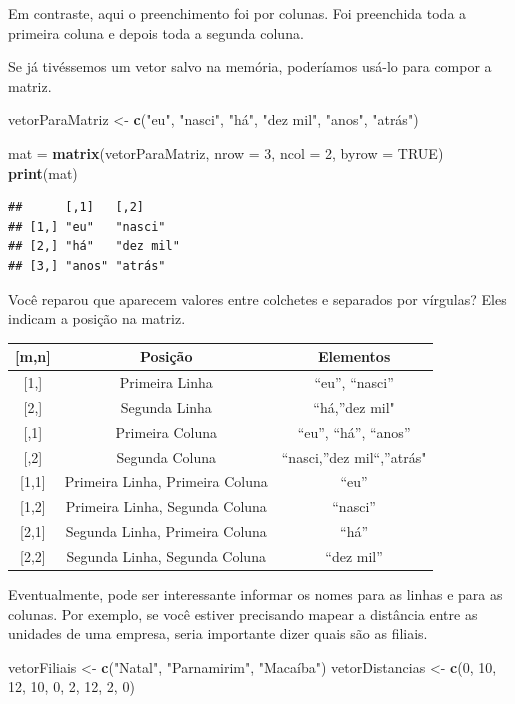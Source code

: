 \documentclass[
]{book}
\newenvironment{Shaded}{\begin{snugshade}}{\end{snugshade}}
\newcommand{\DataTypeTok}[1]{\textcolor[rgb]{0.13,0.29,0.53}{#1}}
\newcommand{\DecValTok}[1]{\textcolor[rgb]{0.00,0.00,0.81}{#1}}
\newcommand{\KeywordTok}[1]{\textcolor[rgb]{0.13,0.29,0.53}{\textbf{#1}}}
\newcommand{\NormalTok}[1]{#1}
\newcommand{\OtherTok}[1]{\textcolor[rgb]{0.56,0.35,0.01}{#1}}
\newcommand{\StringTok}[1]{\textcolor[rgb]{0.31,0.60,0.02}{#1}}
\begin{document}
Em contraste, aqui o preenchimento foi por colunas. Foi preenchida toda a primeira coluna e depois toda a segunda coluna.

Se já tivéssemos um vetor salvo na memória, poderíamos usá-lo para compor a matriz.

\begin{Shaded}
\begin{Highlighting}[]
\NormalTok{vetorParaMatriz <-}\StringTok{ }\KeywordTok{c}\NormalTok{(}\StringTok{"eu"}\NormalTok{, }\StringTok{"nasci"}\NormalTok{, }\StringTok{"há"}\NormalTok{, }\StringTok{"dez mil"}\NormalTok{, }\StringTok{"anos"}\NormalTok{, }\StringTok{"atrás"}\NormalTok{) }

\NormalTok{mat =}\StringTok{ }\KeywordTok{matrix}\NormalTok{(vetorParaMatriz, }\DataTypeTok{nrow =} \DecValTok{3}\NormalTok{, }\DataTypeTok{ncol =} \DecValTok{2}\NormalTok{, }\DataTypeTok{byrow =} \OtherTok{TRUE}\NormalTok{)}
\KeywordTok{print}\NormalTok{(mat)}
\end{Highlighting}
\end{Shaded}

\begin{verbatim}
##      [,1]   [,2]     
## [1,] "eu"   "nasci"  
## [2,] "há"   "dez mil"
## [3,] "anos" "atrás"
\end{verbatim}

Você reparou que aparecem valores entre colchetes e separados por vírgulas? Eles indicam a posição na matriz.

\begin{longtable}[]{@{}ccc@{}}
\toprule
{[}m,n{]} & Posição & Elementos\tabularnewline
\midrule
\endhead
{[}1,{]} & Primeira Linha & ``eu'', ``nasci''\tabularnewline
{[}2,{]} & Segunda Linha & ``há,''dez mil"\tabularnewline
{[},1{]} & Primeira Coluna & ``eu'', ``há'', ``anos''\tabularnewline
{[},2{]} & Segunda Coluna & ``nasci,''dez mil``,''atrás"\tabularnewline
{[}1,1{]} & Primeira Linha, Primeira Coluna & ``eu''\tabularnewline
{[}1,2{]} & Primeira Linha, Segunda Coluna & ``nasci''\tabularnewline
{[}2,1{]} & Segunda Linha, Primeira Coluna & ``há''\tabularnewline
{[}2,2{]} & Segunda Linha, Segunda Coluna & ``dez mil''\tabularnewline
\bottomrule
\end{longtable}

Eventualmente, pode ser interessante informar os nomes para as linhas e para as colunas. Por exemplo, se você estiver precisando mapear a distância entre as unidades de uma empresa, seria importante dizer quais são as filiais.

\begin{Shaded}
\begin{Highlighting}[]
\NormalTok{vetorFiliais <-}\StringTok{ }\KeywordTok{c}\NormalTok{(}\StringTok{"Natal"}\NormalTok{, }\StringTok{"Parnamirim"}\NormalTok{, }\StringTok{"Macaíba"}\NormalTok{)}
\NormalTok{vetorDistancias <-}\StringTok{ }\KeywordTok{c}\NormalTok{(}\DecValTok{0}\NormalTok{, }\DecValTok{10}\NormalTok{, }\DecValTok{12}\NormalTok{, }\DecValTok{10}\NormalTok{, }\DecValTok{0}\NormalTok{, }\DecValTok{2}\NormalTok{, }\DecValTok{12}\NormalTok{, }\DecValTok{2}\NormalTok{, }\DecValTok{0}\NormalTok{)}
\end{Highlighting}
\end{Shaded}
\end{document}
